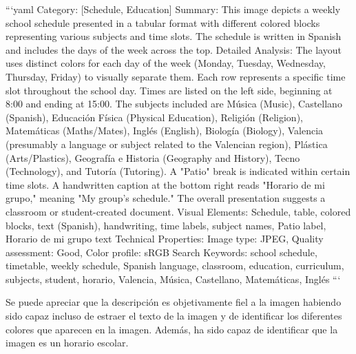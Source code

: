 ```yaml
Category: [Schedule, Education] Summary: This image depicts a weekly school schedule presented in a tabular format with different colored blocks representing various subjects and time slots. The schedule is written in Spanish and includes the days of the week across the top. Detailed Analysis: The layout uses distinct colors for each day of the week (Monday, Tuesday, Wednesday, Thursday, Friday) to visually separate them. Each row represents a specific time slot throughout the school day. Times are listed on the left side, beginning at 8:00 and ending at 15:00. The subjects included are Música (Music), Castellano (Spanish), Educación Física (Physical Education), Religión (Religion), Matemáticas (Maths/Mates), Inglés (English), Biología (Biology), Valencia (presumably a language or subject related to the Valencian region), Plástica (Arts/Plastics), Geografía e Historia (Geography and History), Tecno (Technology), and Tutoría (Tutoring). A "Patio" break is indicated within certain time slots. A handwritten caption at the bottom right reads "Horario de mi grupo," meaning "My group's schedule." The overall presentation suggests a classroom or student-created document. Visual Elements: Schedule, table, colored blocks, text (Spanish), handwriting, time labels, subject names, Patio label, Horario de mi grupo text Technical Properties: Image type: JPEG, Quality assessment: Good, Color profile: sRGB Search Keywords: school schedule, timetable, weekly schedule, Spanish language, classroom, education, curriculum, subjects, student, horario, Valencia, Música, Castellano, Matemáticas, Inglés
```

Se puede apreciar que la descripción es objetivamente fiel a la imagen habiendo sido capaz incluso de estraer el texto de la imagen y de identificar los diferentes colores que aparecen en la imagen. Además, ha sido capaz de identificar que la imagen es un horario escolar.

